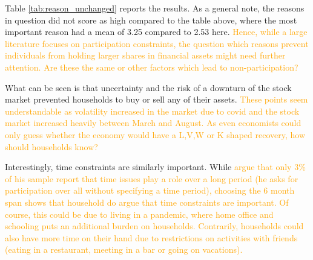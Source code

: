 \documentclass[ProjectABM]{subfiles}
\begin{document}
Table \ref{tab:reason_unchanged} reports the results. As a general note, the reasons in question did not score as high compared to the table above, where the most important reason had a mean of 3.25 compared to 2.53 here. \textcolor{orange}{Hence, while a large literature focuses on participation constraints, the question which reasons prevent individuals from holding larger shares in financial assets might need further attention. Are these the same or other factors which lead to non-participation?}

What can be seen is that uncertainty and the risk of a downturn of the stock market prevented households to buy or sell any of their assets. \textcolor{orange}{These points seem understandable as volatility increased in the market due to covid and the stock market increased heavily between March and August. As even economists could only guess whether the economy would have a L,V,W or K shaped recovery, how should households know?}

Interestingly, time constraints are similarly important. While \textcolor{orange}{\cite{choi_2020} argue that only 3\% of his sample report that time issues play a role over a long period (he asks for participation over all without specifying a time period), choosing the 6 month span shows that household do argue that time constraints are important. Of course, this could be due to living in a pandemic, where home office and schooling puts an additional burden on households. Contrarily, households could also have more time on their hand due to restrictions on activities with friends (eating in a restaurant, meeting in a bar or going on vacations).}


\end{document}
